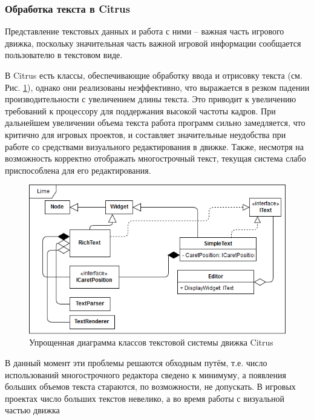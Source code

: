\documentclass{fefu}
\begin{document}
			\subsubsection{Обработка текста в Citrus}
				\par Представление текстовых данных и работа с ними -- важная часть игрового
				движка, поскольку значительная часть важной игровой информации сообщается 
				пользователю в текстовом виде. 
				\par В Citrus есть классы, обеспечивающие обработку ввода и отрисовку текста 
				(см. Рис. \ref{diag:CitrusTextSystem}), 
				однако они реализованы неэффективно, что выражается в резком падении 
				производительности с увеличением длины текста. Это приводит к увеличению
				требований к процессору для поддержания высокой частоты кадров. При дальнейшем
				увеличении объема текста работа программ сильно замедляется, что критично для
				игровых проектов, и составляет значительные неудобства при работе со средствами
				визуального редактирования в движке. Также, несмотря на
				возможность корректно отображать многострочный текст, текущая система слабо
				приспособлена для его редактирования.
				\begin{figure}[H]
					\centering
					\includegraphics[width=1\linewidth]{diagrams/CitrusTextSystem.png}
					\caption{Упрощенная диаграмма классов текстовой системы движка Citrus}
					\label{diag:CitrusTextSystem}
				\end{figure}
				\par В данный момент эти проблемы решаются обходным путём, т.е. число
				использований многострочного редактора сведено к минимуму, а появления больших
				объемов текста стараются, по возможности, не допускать. В игровых проектах
				число больших текстов невелико, а во время работы с визуальной частью движка
\end{document}
